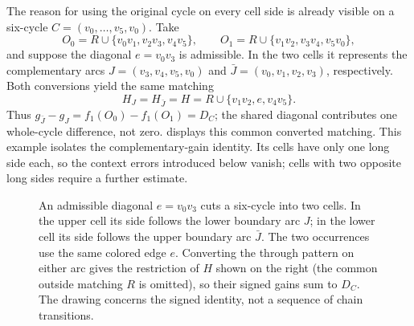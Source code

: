 \documentclass[11pt]{article}
\theoremstyle{definition}
\theoremstyle{remark}
\numberwithin{equation}{section}
\begin{document}
The reason for using the original cycle on every cell side is already
visible on a six-cycle $C=(v_0,\ldots,v_5,v_0)$. Take
\[
 O_0=R\cup\{v_0v_1,v_2v_3,v_4v_5\},\qquad
 O_1=R\cup\{v_1v_2,v_3v_4,v_5v_0\},
\]
and suppose the diagonal $e=v_0v_3$ is admissible. In the two cells
it represents the complementary arcs
$J=(v_3,v_4,v_5,v_0)$ and $\bar J=(v_0,v_1,v_2,v_3)$, respectively.
Both conversions yield the same matching
\[
 H_J=H_{\bar J}=H=R\cup\{v_1v_2,e,v_4v_5\}.
\]
Thus $g_{\bar J}-g_J=f_1(O_0)-f_1(O_1)=D_C$; the shared diagonal
contributes one whole-cycle difference, not zero.
 displays this common converted matching.
This example isolates the complementary-gain identity. Its cells have
only one long side each, so the context errors introduced below vanish;
cells with two opposite long sides require a further estimate.

\begin{figure}[ht]
\centering
{}
\caption{An admissible diagonal $e=v_0v_3$ cuts a six-cycle into two
cells. In the upper cell its side follows the lower boundary arc $J$;
in the lower cell its side follows the upper boundary arc $\bar J$.
The two occurrences use the same colored edge $e$. Converting the
through pattern on either arc gives the restriction of $H$ shown on
the right (the common outside matching $R$ is omitted),
so their signed gains sum to $D_C$. The drawing concerns the signed
identity, not a sequence of chain transitions.}
\label{fig:complementary-arcs}
\end{figure}
\end{document}
